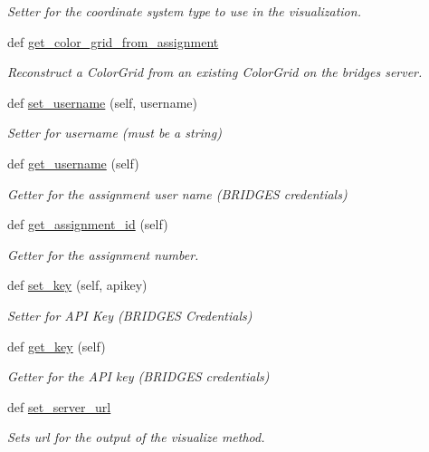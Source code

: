 \begin{DoxyCompactItemize}
\begin{DoxyCompactList}\small\item\em Setter for the coordinate system type to use in the visualization. \end{DoxyCompactList}\item 
def \hyperlink{classbridges_1_1bridges_1_1_bridges_a11c2be346fba56589955894c5f84747d}{get\+\_\+color\+\_\+grid\+\_\+from\+\_\+assignment}
\begin{DoxyCompactList}\small\item\em Reconstruct a Color\+Grid from an existing Color\+Grid on the bridges server. \end{DoxyCompactList}\item 
def \hyperlink{classbridges_1_1bridges_1_1_bridges_a3f97735d336faf40585e99362d64a3ee}{set\+\_\+username} (self, username)
\begin{DoxyCompactList}\small\item\em Setter for username (must be a string) \end{DoxyCompactList}\item 
def \hyperlink{classbridges_1_1bridges_1_1_bridges_abf6fdb19db336c2ed14987fdd89d65fe}{get\+\_\+username} (self)
\begin{DoxyCompactList}\small\item\em Getter for the assignment user name (B\+R\+I\+D\+G\+ES credentials) \end{DoxyCompactList}\item 
def \hyperlink{classbridges_1_1bridges_1_1_bridges_a94f39f11368031ad33800aac0bac2f7d}{get\+\_\+assignment\+\_\+id} (self)
\begin{DoxyCompactList}\small\item\em Getter for the assignment number. \end{DoxyCompactList}\item 
def \hyperlink{classbridges_1_1bridges_1_1_bridges_a5841bc54e3663249e76f4b34f5a3a593}{set\+\_\+key} (self, apikey)
\begin{DoxyCompactList}\small\item\em Setter for A\+PI Key (B\+R\+I\+D\+G\+ES Credentials) \end{DoxyCompactList}\item 
def \hyperlink{classbridges_1_1bridges_1_1_bridges_afcdb0291c535b41fb7be31eaf5bf3677}{get\+\_\+key} (self)
\begin{DoxyCompactList}\small\item\em Getter for the A\+PI key (B\+R\+I\+D\+G\+ES credentials) \end{DoxyCompactList}\item 
def \hyperlink{classbridges_1_1bridges_1_1_bridges_a74009f2eaf24464f9769ea6166d20e59}{set\+\_\+server\+\_\+url}
\begin{DoxyCompactList}\small\item\em Sets url for the output of the visualize method. \end{DoxyCompactList}\end{DoxyCompactItemize}
